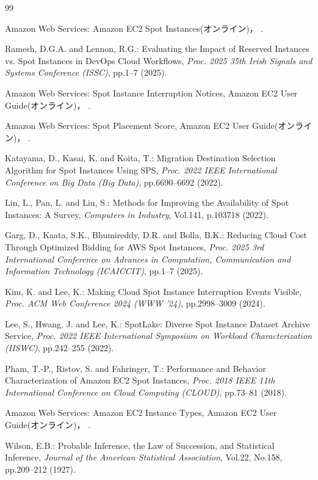 \documentclass[submit,techrep,noauthor]{ipsj}
\begin{document}
\begin{thebibliography}{99}

Amazon Web Services: Amazon EC2 Spot Instances(オンライン)，
%
.

Ramesh, D.G.A. and Lennon, R.G.:
Evaluating the Impact of Reserved Instances vs. Spot Instances
in DevOps Cloud Workflows,
{\it Proc. 2025 35th Irish Signals and Systems Conference (ISSC)}, pp.1--7 (2025).

Amazon Web Services: Spot Instance Interruption Notices, Amazon EC2 User Guide(オンライン)，
%
.

Amazon Web Services: Spot Placement Score, Amazon EC2 User Guide(オンライン)，
%
.

Katayama, D., Kasai, K. and Koita, T.:
Migration Destination Selection Algorithm for Spot Instances Using SPS,
{\it Proc. 2022 IEEE International Conference on Big Data (Big Data)},
pp.6690--6692 (2022).

Lin, L., Pan, L. and Liu, S.:
Methods for Improving the Availability of Spot Instances: A Survey,
{\it Computers in Industry}, Vol.141, p.103718 (2022).

Garg, D., Kaata, S.K., Bhumireddy, D.R. and Bolla, B.K.:
Reducing Cloud Cost Through Optimized Bidding for AWS Spot Instances,
{\it Proc. 2025 3rd International Conference on Advances in Computation,
Communication and Information Technology (ICAICCIT)}, pp.1--7 (2025).

Kim, K. and Lee, K.:
Making Cloud Spot Instance Interruption Events Visible,
{\it Proc. ACM Web Conference 2024 (WWW '24)}, pp.2998--3009 (2024).

Lee, S., Hwang, J. and Lee, K.:
SpotLake: Diverse Spot Instance Dataset Archive Service,
{\it Proc. 2022 IEEE International Symposium on Workload Characterization (IISWC)},
pp.242--255 (2022).

Pham, T.-P., Ristov, S. and Fahringer, T.:
Performance and Behavior Characterization of Amazon EC2 Spot Instances,
{\it Proc. 2018 IEEE 11th International Conference on Cloud Computing (CLOUD)},
pp.73--81 (2018).

Amazon Web Services: Amazon EC2 Instance Types, Amazon EC2 User Guide(オンライン)，
%
.

Wilson, E.B.:
Probable Inference, the Law of Succession, and Statistical Inference,
{\it Journal of the American Statistical Association}, Vol.22, No.158,
pp.209--212 (1927).

\end{thebibliography}
\end{document}
